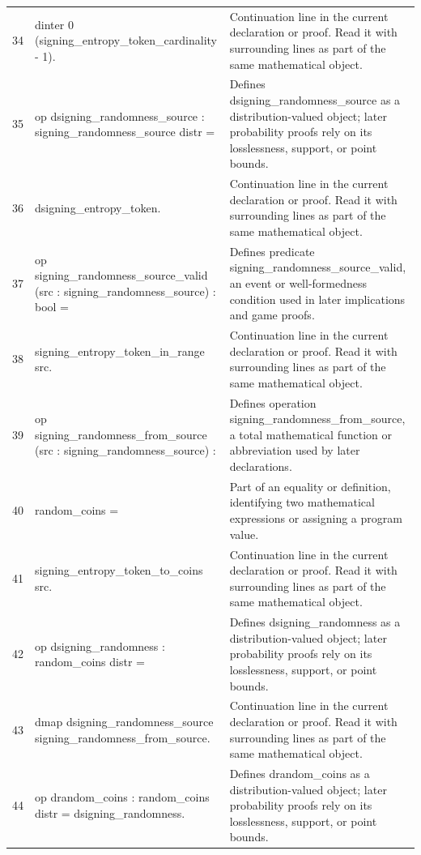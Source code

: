 \documentclass[10pt]{article}
\begin{document}
\begin{longtable}{r L{0.53\textwidth} L{0.37\textwidth}}
34 & {\ttfamily\scriptsize   dinter 0 (signing\_entropy\_token\_cardinality - 1).} & Continuation line in the current declaration or proof.  Read it with surrounding lines as part of the same mathematical object. \\
35 & {\ttfamily\scriptsize op dsigning\_randomness\_source : signing\_randomness\_source distr =} & Defines dsigning\_randomness\_source as a distribution-valued object; later probability proofs rely on its losslessness, support, or point bounds. \\
36 & {\ttfamily\scriptsize   dsigning\_entropy\_token.} & Continuation line in the current declaration or proof.  Read it with surrounding lines as part of the same mathematical object. \\
37 & {\ttfamily\scriptsize op signing\_randomness\_source\_valid (src : signing\_randomness\_source) : bool =} & Defines predicate signing\_randomness\_source\_valid, an event or well-formedness condition used in later implications and game proofs. \\
38 & {\ttfamily\scriptsize   signing\_entropy\_token\_in\_range src.} & Continuation line in the current declaration or proof.  Read it with surrounding lines as part of the same mathematical object. \\
39 & {\ttfamily\scriptsize op signing\_randomness\_from\_source (src : signing\_randomness\_source) :} & Defines operation signing\_randomness\_from\_source, a total mathematical function or abbreviation used by later declarations. \\
40 & {\ttfamily\scriptsize   random\_coins =} & Part of an equality or definition, identifying two mathematical expressions or assigning a program value. \\
41 & {\ttfamily\scriptsize   signing\_entropy\_token\_to\_coins src.} & Continuation line in the current declaration or proof.  Read it with surrounding lines as part of the same mathematical object. \\
42 & {\ttfamily\scriptsize op dsigning\_randomness : random\_coins distr =} & Defines dsigning\_randomness as a distribution-valued object; later probability proofs rely on its losslessness, support, or point bounds. \\
43 & {\ttfamily\scriptsize   dmap dsigning\_randomness\_source signing\_randomness\_from\_source.} & Continuation line in the current declaration or proof.  Read it with surrounding lines as part of the same mathematical object. \\
44 & {\ttfamily\scriptsize op drandom\_coins : random\_coins distr = dsigning\_randomness.} & Defines drandom\_coins as a distribution-valued object; later probability proofs rely on its losslessness, support, or point bounds. \\

\end{longtable}
\end{document}
